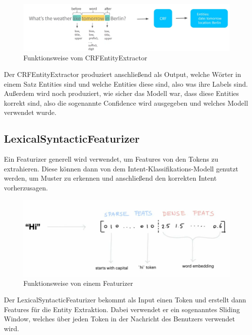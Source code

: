 \begin{figure}[hbt!]
    \centering
    \includegraphics[scale=0.35]{pics/crf-entity-extractor}
    \caption{Funktionsweise vom CRFEntityExtractor~\cite{pipelineComponentsYoutube}}
    \label{fig:CRFEntityExtractor}
\end{figure}

Der CRFEntityExtractor produziert anschließend als Output, welche Wörter in einem Satz Entities sind und welche Entities diese sind, also was ihre Labels sind.
Außerdem wird noch produziert, wie sicher das Modell war, dass diese Entities korrekt sind, also die sogenannte Confidence wird ausgegeben und welches Modell verwendet wurde.\cite{crfEntityExtractor, pipelineComponentsYoutube, regexFeaturizerCrf}

\subsection{LexicalSyntacticFeaturizer}

Ein Featurizer generell wird verwendet, um Features von den Tokens zu extrahieren.
Diese können dann von dem Intent-Klassifikations-Modell genutzt werden, um Muster zu erkennen und anschließend den korrekten Intent vorherzusagen.\cite{lexicalSyntacticFeaturizer, pipelineComponentsYoutube, pipelineConfigurationVideo}

\begin{figure}[hbt!]
    \centering
    \includegraphics[scale=0.5]{pics/featurizer}
    \caption{Funktionsweise von einem Featurizer~\cite{pipelineConfigurationVideo}}
    \label{fig:Featurizer}
\end{figure}

Der LexicalSyntacticFeaturizer bekommt als Input einen Token und erstellt dann Features für die Entity Extraktion.
Dabei verwendet er ein sogenanntes Sliding Window, welches über jeden Token in der Nachricht des Benutzers verwendet wird.\cite{lexicalSyntacticFeaturizer, pipelineComponentsYoutube, pipelineConfigurationVideo}

